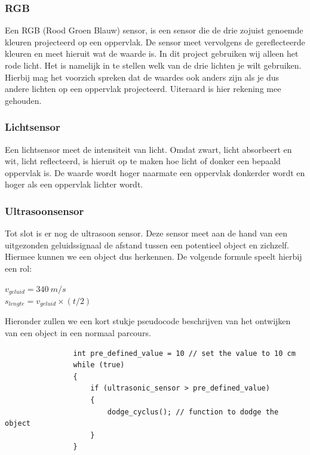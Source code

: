 \documentclass[12pt]{article}
\begin{document}
		\subsubsection{RGB}
			Een RGB (Rood Groen Blauw) sensor, is een sensor die de drie zojuist genoemde kleuren projecteerd op een oppervlak. De sensor meet vervolgens de gereflecteerde kleuren en meet hieruit wat de waarde is. In dit project gebruiken wij alleen het rode licht. Het is namelijk in te stellen welk van de drie lichten je wilt gebruiken. Hierbij mag het voorzich spreken dat de waardes ook anders zijn als je dus andere lichten op een oppervlak projecteerd. Uiteraard is hier rekening mee gehouden.
			
		\subsubsection{Lichtsensor}
			Een lichtsensor meet de intensiteit van licht. Omdat zwart, licht absorbeert en wit, licht reflecteerd, is hieruit op te maken hoe licht of donker een bepaald oppervlak is. De waarde wordt hoger naarmate een oppervlak donkerder wordt en hoger als een oppervlak lichter wordt.
			
		\subsubsection{Ultrasoonsensor}
			Tot slot is er nog de ultrasoon sensor. Deze sensor meet aan de hand van een uitgezonden geluidssignaal de afstand tussen een potentieel object en zichzelf. Hiermee kunnen we een object dus herkennen. De volgende formule speelt hierbij een rol:
			\begin{center}
				\Large $v_{geluid} = 340\ m/s$ \\
				\Large $s_{lengte} = v_{geluid} \times (t / 2)$ \\[0.5cm]
			\end{center}
			Hieronder zullen we een kort stukje pseudocode beschrijven van het ontwijken van een object in een normaal parcours.
			\begin{lstlisting}
				int pre_defined_value = 10 // set the value to 10 cm
				while (true)
				{
				    if (ultrasonic_sensor > pre_defined_value)
				    {
					    dodge_cyclus(); // function to dodge the object
				    }
				}
			\end{lstlisting}
		
\end{document}
